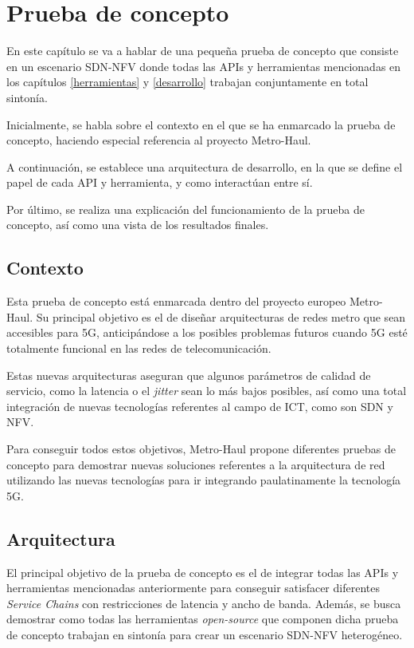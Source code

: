 \chapter{Prueba de concepto}
\label{pruebaconcepto}

En este capítulo se va a hablar de una pequeña prueba de concepto que consiste en un escenario \ac{SDN}-\ac{NFV} donde todas las \acp{API} y herramientas mencionadas en los capítulos \ref{herramientas} y \ref{desarrollo} trabajan conjuntamente en total sintonía.

Inicialmente, se habla sobre el contexto en el que se ha enmarcado la prueba de concepto, haciendo especial referencia al proyecto Metro-Haul.

A continuación, se establece una arquitectura de desarrollo, en la que se define el papel de cada \ac{API} y herramienta, y como interactúan entre sí.

Por último, se realiza una explicación del funcionamiento de la prueba de concepto, así como una vista de los resultados finales.

\section{Contexto}
\label{sec:contexto}

Esta prueba de concepto está enmarcada dentro del proyecto europeo Metro-Haul\cite{metrohaulbib}. Su principal objetivo es el de diseñar arquitecturas de redes metro que sean accesibles para 5G, anticipándose a los posibles problemas futuros cuando 5G esté totalmente funcional en las redes de telecomunicación.

Estas nuevas arquitecturas aseguran que algunos parámetros de calidad de servicio, como la latencia o el \textit{jitter} sean lo más bajos posibles, así como una total integración de nuevas tecnologías referentes al campo de \ac{ICT}, como son \ac{SDN} y \ac{NFV}.

Para conseguir todos estos objetivos, Metro-Haul propone diferentes pruebas de concepto para demostrar nuevas soluciones referentes a la arquitectura de red utilizando las nuevas tecnologías para ir integrando paulatinamente la tecnología 5G.

\section{Arquitectura}
\label{sec:arquitectura}

El principal objetivo de la prueba de concepto es el de integrar todas las \acp{API} y herramientas mencionadas anteriormente para conseguir satisfacer diferentes \textit{Service Chains} con restricciones de latencia y ancho de banda. Además, se busca demostrar como todas las herramientas \textit{open-source} que componen dicha prueba de concepto trabajan en sintonía para crear un escenario \ac{SDN}-\ac{NFV} heterogéneo.

